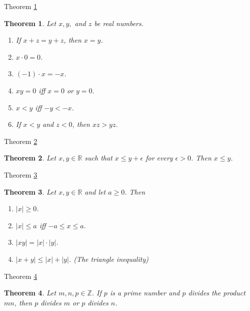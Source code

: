 \documentclass[avery5371,grid]{flashcards}
\newtheorem{theorem}{Theorem}
\newcommand{\bb}[1]{\mathbb{#1}}
\newcommand{\Z}{\bb{Z}}
\newcommand{\R}{\bb{R}}
\begin{document}
\begin{flashcard}[Theorem]{Theorem \ref{thm25}}
\begin{theorem}
\label{thm25}
Let $x,y,$ and $z$ be real numbers.
\begin{enumerate}
\item If $x+z = y + z$, then $x=y$.
\item $x\cdot 0 = 0$.
\item $(-1)\cdot x = -x$.
\item $xy = 0$ iff $x=0$ or $y=0$.
\item $x<y$ iff $-y < -x$.
\item If $x<y$ and $z<0$, then $xz > yz$.
\end{enumerate}
\end{theorem}
\end{flashcard}

\begin{flashcard}[Theorem]{Theorem \ref{thm26}}
\begin{theorem}
\label{thm26}
Let $x,y \in \R$ such that $x \leq y+\epsilon$ for every $\epsilon > 0$.
Then $x \leq y$.
\end{theorem}
\end{flashcard}

\begin{flashcard}[Theorem]{Theorem \ref{thm27}}
\begin{theorem}
\label{thm27}
Let $x, y \in \R$ and let $a \geq 0$.  Then
\begin{enumerate}
\item $|x| \geq 0$.
\item $|x| \leq a$ iff $-a \leq x \leq a$.
\item $|xy| = |x|\cdot |y|$.
\item $|x+y| \leq |x| + |y|$.  (The triangle inequality)
\end{enumerate}
\end{theorem}
\end{flashcard}

\begin{flashcard}[Theorem]{Theorem \ref{thm28}}
\begin{theorem}
\label{thm28}
Let $m,n,p \in \Z$.  If $p$ is a prime number and $p$ divides the
product $mn$, then $p$ divides $m$ or $p$ divides $n$.
\end{theorem}
\end{flashcard}
\end{document}

